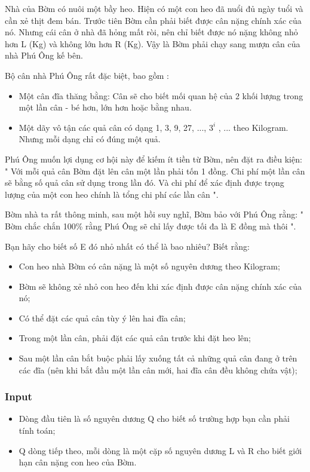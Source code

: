 



   Nhà của Bờm có nuôi một bầy heo. Hiện có một con heo đã nuổi đủ ngày tuổi và cần xẻ thịt đem bán. Trước tiên Bờm cần phải biết được cân nặng chính xác của nó. Nhưng cái cân ở nhà đã hỏng mất ròi, nên chỉ biết được nó nặng không nhỏ hơn L (Kg) và không lớn hơn R (Kg). Vậy là Bờm phải chạy sang mượn cân của nhà Phú Ông kế bên.  

   Bộ cân nhà Phú Ông rất đặc biệt, bao gồm :  
\begin{itemize}
	\item     Một cân đĩa thăng bằng: Cân sẽ cho biết mối quan hệ của 2 khối lượng trong một lần cân - bé hơn, lớn hơn hoặc bằng nhau.   
	\item     Một dãy vô tận các quả cân có dạng 1, 3, 9, 27, ..., $3^{i}$    , ... theo Kilogram. Nhưng mỗi dạng chỉ có đúng một quả.   
\end{itemize}

   Phú Ông muốn lợi dụng cơ hội này để kiếm ít tiền từ Bờm, nên đặt ra điều kiện: "   Với mỗi quả cân Bờm đặt lên cân một lần phải tốn 1 đồng. Chi phí một lần cân sẽ bằng số quả cân sử dụng trong lần đó. Và chi phí để xác định được trọng lượng của một con heo chính là tổng chi phí các lần cân   ".  

   Bờm nhà ta rất thông minh, sau một hồi suy nghĩ, Bờm bảo với Phú Ông rằng: "   Bờm chắc chắn 100\% rằng Phú Ông sẽ chỉ lấy được tối đa là E đồng mà thôi   ".  

   Bạn hãy cho biết số E đó nhỏ nhất có thể là bao nhiêu? Biết rằng:  
\begin{itemize}
	\item     Con heo nhà Bờm có cân nặng là một số nguyên dương theo Kilogram;   
	\item     Bờm sẽ không xẻ nhỏ con heo đến khi xác định được cân nặng chính xác của nó;   
	\item     Có thể đặt các quả cân tùy ý lên hai đĩa cân;   
	\item     Trong một lần cân, phải đặt các quả cân trước khi đặt heo lên;   
	\item     Sau một lần cân bắt buộc phải lấy xuống tất cả những quả cân đang ở trên  các đĩa (nên khi bắt đầu một lần cân mới, hai đĩa cân đều không chứa  vật);   
\end{itemize}

\subsubsection{   Input  }
\begin{itemize}
	\item     Dòng đầu tiên là số nguyên dương Q cho biết số trường hợp bạn cần phải tính toán;   
	\item     Q dòng tiếp theo, mỗi dòng là một cặp số nguyên dương L và R cho biết giới hạn cân nặng con heo của Bờm.   
\end{itemize}

